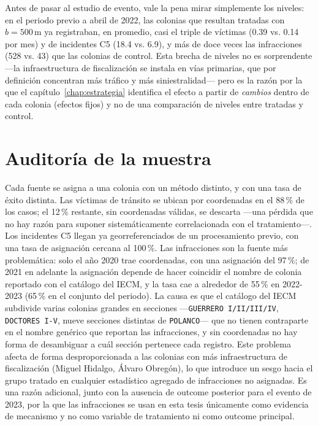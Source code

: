 Antes de pasar al estudio de evento, vale la pena mirar simplemente los
niveles: en el periodo previo a abril de 2022, las colonias que resultan
tratadas con $b=500$\,m ya registraban, en promedio, casi el triple de
víctimas (0.39 vs. 0.14 por mes) y de incidentes C5 (18.4 vs. 6.9), y más de
doce veces las infracciones (528 vs. 43) que las colonias de control. Esta
brecha de niveles no es sorprendente —la infraestructura de fiscalización se
instala en vías primarias, que por definición concentran más tráfico y más
siniestralidad— pero es la razón por la que el capítulo~\ref{chap:estrategia}
identifica el efecto a partir de \emph{cambios} dentro de cada colonia
(efectos fijos) y no de una comparación de niveles entre tratadas y control.

\section{Auditoría de la muestra}
\label{sec:datos_auditoria}

Cada fuente se asigna a una colonia con un método distinto, y con una tasa de
éxito distinta. Las víctimas de tránsito se ubican por coordenadas en el
88\,\% de los casos; el 12\,\% restante, sin coordenadas válidas, se
descarta —una pérdida que no hay razón para suponer sistemáticamente
correlacionada con el tratamiento—. Los incidentes C5 llegan ya
georreferenciados de un procesamiento previo, con una tasa de asignación
cercana al 100\,\%. Las infracciones son la fuente más problemática: solo el
año 2020 trae coordenadas, con una asignación del 97\,\%; de 2021 en adelante
la asignación depende de hacer coincidir el nombre de colonia reportado con el
catálogo del IECM, y la tasa cae a alrededor de 55\,\% en 2022-2023 (65\,\%
en el conjunto del periodo). La causa es que el catálogo del IECM subdivide
varias colonias grandes en secciones —\texttt{GUERRERO I/II/III/IV},
\texttt{DOCTORES I-V}, nueve secciones distintas de \texttt{POLANCO}— que no
tienen contraparte en el nombre genérico que reportan las infracciones, y sin
coordenadas no hay forma de desambiguar a cuál sección pertenece cada
registro. Este problema afecta de forma desproporcionada a las colonias con
más infraestructura de fiscalización (Miguel Hidalgo, Álvaro Obregón), lo que
introduce un sesgo hacia el grupo tratado en cualquier estadístico agregado de
infracciones no asignadas. Es una razón adicional, junto con la ausencia de
outcome posterior para el evento de 2023, por la que las infracciones se usan
en esta tesis únicamente como evidencia de mecanismo y no como variable de
tratamiento ni como outcome principal.

